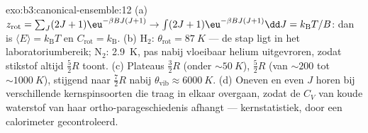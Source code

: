 \begin{solution}{exo:b3:canonical-ensemble:12}
(a) $z_{\text{rot}} = \sum_J(2J+1)\eu^{-\beta BJ(J+1)}
\to \int(2J+1)\eu^{-\beta BJ(J+1)}\dd J = k_{\text{B}}T/B$: dan is
$\langle E\rangle = k_{\text{B}}T$ en $C_{\text{rot}} =
k_{\text{B}}$.
(b) H$_2$: $\theta_{\text{rot}} = \qty{87}{K}$ --- de stap ligt in het
laboratoriumbereik; N$_2$: \qty{2.9}{K}, pas nabij vloeibaar helium
uitgevroren, zodat stikstof altijd $\tfrac52 R$ toont. (c) Plateaus
$\tfrac32 R$ (onder $\sim\qty{50}{K}$), $\tfrac52 R$ (van $\sim200$ tot
$\sim\qty{1000}{K}$), stijgend naar $\tfrac72 R$ nabij
$\theta_{\text{vib}} \approx
\qty{6000}{K}$. (d) Oneven en even $J$ horen
bij verschillende kernspinsoorten die traag in elkaar overgaan, zodat de
$C_V$ van koude waterstof van haar ortho-parageschiedenis afhangt ---
kernstatistiek, door een calorimeter gecontroleerd.
\end{solution}

